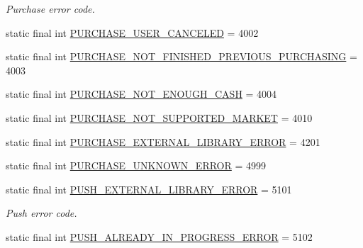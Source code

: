 \begin{DoxyCompactItemize}
\begin{DoxyCompactList}\small\item\em Purchase error code. \end{DoxyCompactList}\item 
static final int \hyperlink{classcom_1_1toast_1_1android_1_1gamebase_1_1base_1_1_gamebase_error_a5bff106b35e4ec08de731f4c04861a1f}{P\+U\+R\+C\+H\+A\+S\+E\+\_\+\+U\+S\+E\+R\+\_\+\+C\+A\+N\+C\+E\+L\+ED} = 4002
\item 
static final int \hyperlink{classcom_1_1toast_1_1android_1_1gamebase_1_1base_1_1_gamebase_error_aa4215a5b5289aa38cdf200c9a54f098d}{P\+U\+R\+C\+H\+A\+S\+E\+\_\+\+N\+O\+T\+\_\+\+F\+I\+N\+I\+S\+H\+E\+D\+\_\+\+P\+R\+E\+V\+I\+O\+U\+S\+\_\+\+P\+U\+R\+C\+H\+A\+S\+I\+NG} = 4003
\item 
static final int \hyperlink{classcom_1_1toast_1_1android_1_1gamebase_1_1base_1_1_gamebase_error_a9c30750707323692db2c8344b96a165c}{P\+U\+R\+C\+H\+A\+S\+E\+\_\+\+N\+O\+T\+\_\+\+E\+N\+O\+U\+G\+H\+\_\+\+C\+A\+SH} = 4004
\item 
static final int \hyperlink{classcom_1_1toast_1_1android_1_1gamebase_1_1base_1_1_gamebase_error_a55d68288ba8d0c83950b50cec0f80a84}{P\+U\+R\+C\+H\+A\+S\+E\+\_\+\+N\+O\+T\+\_\+\+S\+U\+P\+P\+O\+R\+T\+E\+D\+\_\+\+M\+A\+R\+K\+ET} = 4010
\item 
static final int \hyperlink{classcom_1_1toast_1_1android_1_1gamebase_1_1base_1_1_gamebase_error_a5e0e68e0ccd1e16526599293c38122e5}{P\+U\+R\+C\+H\+A\+S\+E\+\_\+\+E\+X\+T\+E\+R\+N\+A\+L\+\_\+\+L\+I\+B\+R\+A\+R\+Y\+\_\+\+E\+R\+R\+OR} = 4201
\item 
static final int \hyperlink{classcom_1_1toast_1_1android_1_1gamebase_1_1base_1_1_gamebase_error_a4954d9c824504e5ecb7a660611a06455}{P\+U\+R\+C\+H\+A\+S\+E\+\_\+\+U\+N\+K\+N\+O\+W\+N\+\_\+\+E\+R\+R\+OR} = 4999
\item 
static final int \hyperlink{classcom_1_1toast_1_1android_1_1gamebase_1_1base_1_1_gamebase_error_a32799f53809522f48199d87b1742424c}{P\+U\+S\+H\+\_\+\+E\+X\+T\+E\+R\+N\+A\+L\+\_\+\+L\+I\+B\+R\+A\+R\+Y\+\_\+\+E\+R\+R\+OR} = 5101
\begin{DoxyCompactList}\small\item\em Push error code. \end{DoxyCompactList}\item 
static final int \hyperlink{classcom_1_1toast_1_1android_1_1gamebase_1_1base_1_1_gamebase_error_a07f43cdd647b44c79a5495de908d15b9}{P\+U\+S\+H\+\_\+\+A\+L\+R\+E\+A\+D\+Y\+\_\+\+I\+N\+\_\+\+P\+R\+O\+G\+R\+E\+S\+S\+\_\+\+E\+R\+R\+OR} = 5102

\end{DoxyCompactItemize}
